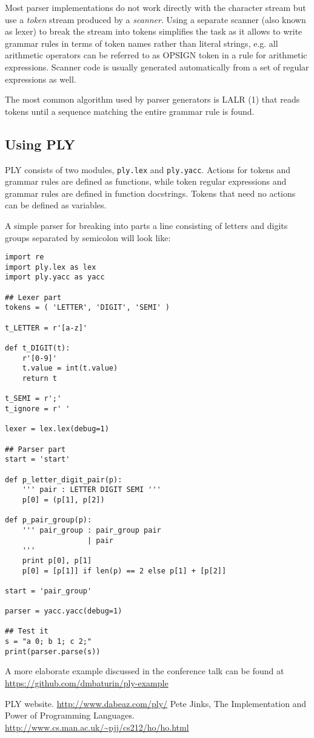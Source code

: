 \documentclass[10pt, a5paper]{article}
\begin{document}
Most parser implementations do not work directly with the character stream but use a \emph{token} stream produced by a \emph{scanner}. Using a separate scanner (also known as lexer) to break the stream into tokens simplifies the task as it allows to write grammar rules in terms of token names rather than literal strings, e.g. all arithmetic operators can be referred to as OPSIGN token in a rule for arithmetic expressions. Scanner code is usually generated automatically from a set of regular expressions as well.

The most common algorithm used by parser generators is LALR (1) that reads tokens until a sequence matching the entire grammar rule is found.

\subsection*{Using PLY}

PLY consists of two modules, \verb!ply.lex! and \verb!ply.yacc!. Actions for tokens and grammar rules are defined as functions, while token regular expressions and grammar rules are defined in function docstrings. Tokens that need no actions can be defined as variables.

A simple parser for breaking into parts a line consisting of letters and digits groups separated by semicolon will look like:

\begin{verbatim}
import re
import ply.lex as lex
import ply.yacc as yacc

## Lexer part
tokens = ( 'LETTER', 'DIGIT', 'SEMI' )

t_LETTER = r'[a-z]'

def t_DIGIT(t):
    r'[0-9]'
    t.value = int(t.value)
    return t

t_SEMI = r';'
t_ignore = r' '

lexer = lex.lex(debug=1)

## Parser part
start = 'start'

def p_letter_digit_pair(p):
    ''' pair : LETTER DIGIT SEMI '''
    p[0] = (p[1], p[2])

def p_pair_group(p):
    ''' pair_group : pair_group pair
                   | pair
    '''
    print p[0], p[1]
    p[0] = [p[1]] if len(p) == 2 else p[1] + [p[2]]

start = 'pair_group'

parser = yacc.yacc(debug=1)

## Test it
s = "a 0; b 1; c 2;"
print(parser.parse(s))
\end{verbatim}

A more elaborate example discussed in the conference talk can be found at \url{https://github.com/dmbaturin/ply-example}


\begin{thebibliography}{9}
 PLY website. \url{http://www.dabeaz.com/ply/}
 Pete Jinks, The Implementation and Power of Programming Languages. \url{http://www.cs.man.ac.uk/~pjj/cs212/ho/ho.html}
\end{thebibliography}
\end{document}

